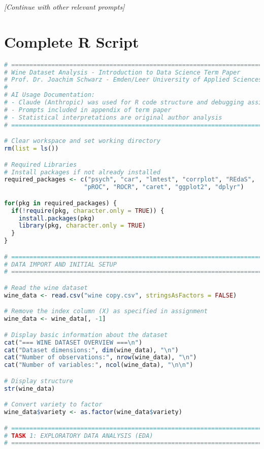 \textit{[Continue with other relevant prompts]}

\chapter{Complete R Script}

\begin{lstlisting}[language=R, caption=Complete Wine Analysis R Script, breaklines=true]
# =============================================================================
# Wine Dataset Analysis - Introduction to Data Science Term Paper
# Prof. Dr. Joachim Schwarz - Emden/Leer University of Applied Sciences
# 
# AI Usage Documentation:
# - Claude (Anthropic) was used for R code structure and debugging assistance
# - Prompts included in appendix of term paper
# - Statistical interpretations are original author analysis
# =============================================================================

# Clear workspace and set working directory
rm(list = ls())

# Required Libraries
# Install packages if not already installed
required_packages <- c("psych", "car", "lmtest", "corrplot", "REdaS", 
                      "pROC", "ROCR", "caret", "ggplot2", "dplyr")

for(pkg in required_packages) {
  if(!require(pkg, character.only = TRUE)) {
    install.packages(pkg)
    library(pkg, character.only = TRUE)
  }
}

# =============================================================================
# DATA IMPORT AND INITIAL SETUP
# =============================================================================

# Read the wine dataset
wine_data <- read.csv("wine copy.csv", stringsAsFactors = FALSE)

# Remove the index column (X) as specified in assignment
wine_data <- wine_data[, -1]

# Display basic information about the dataset
cat("=== WINE DATASET OVERVIEW ===\n")
cat("Dataset dimensions:", dim(wine_data), "\n")
cat("Number of observations:", nrow(wine_data), "\n")
cat("Number of variables:", ncol(wine_data), "\n\n")

# Display structure
str(wine_data)

# Convert variety to factor
wine_data$variety <- as.factor(wine_data$variety)

# =============================================================================
# TASK 1: EXPLORATORY DATA ANALYSIS (EDA)
# =============================================================================


\end{lstlisting}
